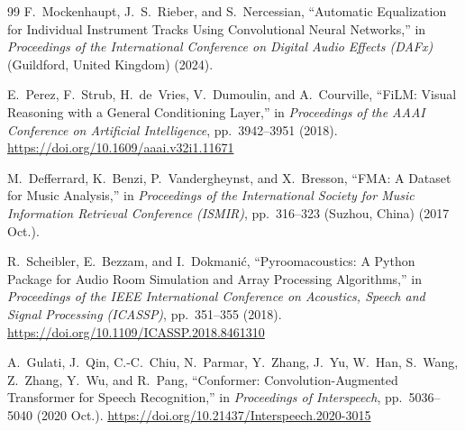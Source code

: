 \documentclass{aes2e}
\begin{document}
\begin{thebibliography}{99}
F.~Mockenhaupt, J.~S.~Rieber, and S.~Nercessian,
``Automatic Equalization for Individual Instrument Tracks Using Convolutional
Neural Networks,''
in \emph{Proceedings of the International Conference on Digital Audio Effects
(DAFx)} (Guildford, United Kingdom) (2024).

E.~Perez, F.~Strub, H.~de~Vries, V.~Dumoulin, and A.~Courville,
``FiLM: Visual Reasoning with a General Conditioning Layer,''
in \emph{Proceedings of the AAAI Conference on Artificial Intelligence},
pp.~3942--3951 (2018).
\url{https://doi.org/10.1609/aaai.v32i1.11671}

M.~Defferrard, K.~Benzi, P.~Vandergheynst, and X.~Bresson,
``FMA: A Dataset for Music Analysis,''
in \emph{Proceedings of the International Society for Music Information
Retrieval Conference (ISMIR)}, pp.~316--323 (Suzhou, China) (2017 Oct.).

R.~Scheibler, E.~Bezzam, and I.~Dokmanić,
``Pyroomacoustics: A Python Package for Audio Room Simulation and Array
Processing Algorithms,''
in \emph{Proceedings of the IEEE International Conference on Acoustics,
Speech and Signal Processing (ICASSP)}, pp.~351--355 (2018).
\url{https://doi.org/10.1109/ICASSP.2018.8461310}

A.~Gulati, J.~Qin, C.-C.~Chiu, N.~Parmar, Y.~Zhang, J.~Yu, W.~Han,
S.~Wang, Z.~Zhang, Y.~Wu, and R.~Pang,
``Conformer: Convolution-Augmented Transformer for Speech Recognition,''
in \emph{Proceedings of Interspeech}, pp.~5036--5040 (2020 Oct.).
\url{https://doi.org/10.21437/Interspeech.2020-3015}

\end{thebibliography}

\end{document}

